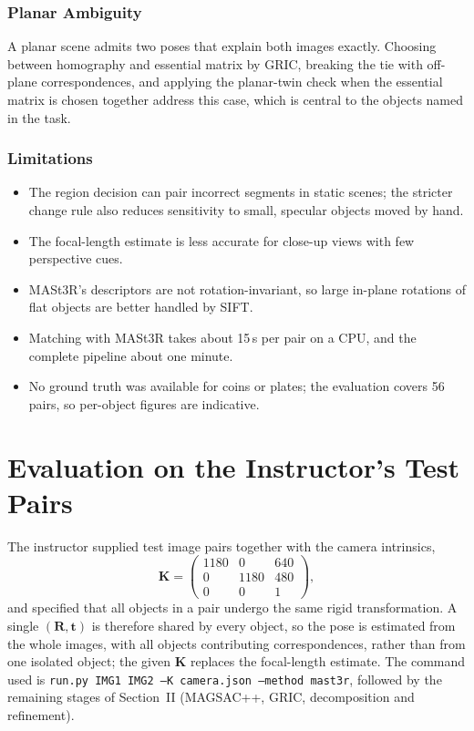 \documentclass[journal]{IEEEtran}
\newcommand{\R}{\mathbf{R}}
\newcommand{\tv}{\mathbf{t}}
\newcommand{\K}{\mathbf{K}}
\begin{document}
\subsubsection{Planar Ambiguity}
A planar scene admits two poses that explain both images exactly. Choosing between homography and essential matrix by GRIC, breaking the tie with off-plane correspondences, and applying the planar-twin check when the essential matrix is chosen together address this case, which is central to the objects named in the task.

\subsubsection{Limitations}
\begin{itemize}
  \item The region decision can pair incorrect segments in static scenes; the stricter change rule also reduces sensitivity to small, specular objects moved by hand.
  \item The focal-length estimate is less accurate for close-up views with few perspective cues.
  \item MASt3R's descriptors are not rotation-invariant, so large in-plane rotations of flat objects are better handled by SIFT.
  \item Matching with MASt3R takes about 15\,s per pair on a CPU, and the complete pipeline about one minute.
  \item No ground truth was available for coins or plates; the evaluation covers 56 pairs, so per-object figures are indicative.
\end{itemize}

\section{Evaluation on the Instructor's Test Pairs}
The instructor supplied test image pairs together with the camera intrinsics,
\begin{equation}
  \K=\begin{pmatrix}1180&0&640\\0&1180&480\\0&0&1\end{pmatrix},
\end{equation}
and specified that all objects in a pair undergo the same rigid transformation. A single $(\R,\tv)$ is therefore shared by every object, so the pose is estimated from the whole images, with all objects contributing correspondences, rather than from one isolated object; the given $\K$ replaces the focal-length estimate. The command used is \texttt{run.py IMG1 IMG2 --K camera.json --method mast3r}, followed by the remaining stages of Section~II (MAGSAC++, GRIC, decomposition and refinement).
\end{document}
